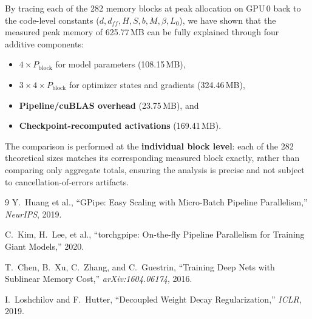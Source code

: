 \documentclass[11pt,a4paper]{article}
\begin{document}
By tracing each of the 282 memory blocks at peak allocation on GPU\,0 back to the code-level constants ($d, d_{ff}, H, S, b, M, \beta, L_0$), we have shown that the measured peak memory of 625.77\,MB can be fully explained through four additive components:
\begin{itemize}
  \item \textbf{$4 \times P_{\text{block}}$} for model parameters (108.15\,MB),
  \item \textbf{$3 \times 4 \times P_{\text{block}}$} for optimizer states and gradients (324.46\,MB),
  \item \textbf{Pipeline/cuBLAS overhead} (23.75\,MB), and
  \item \textbf{Checkpoint-recomputed activations} (169.41\,MB).
\end{itemize}

The comparison is performed at the \textbf{individual block level}: each of the 282 theoretical sizes matches its corresponding measured block exactly, rather than comparing only aggregate totals, ensuring the analysis is precise and not subject to cancellation-of-errors artifacts.

\begin{thebibliography}{9}
Y.~Huang et al.,
``GPipe: Easy Scaling with Micro-Batch Pipeline Parallelism,''
\emph{NeurIPS}, 2019.

C.~Kim, H.~Lee, et al.,
``torchgpipe: On-the-fly Pipeline Parallelism for Training Giant Models,''
2020.

T.~Chen, B.~Xu, C.~Zhang, and C.~Guestrin,
``Training Deep Nets with Sublinear Memory Cost,''
\emph{arXiv:1604.06174}, 2016.

I.~Loshchilov and F.~Hutter,
``Decoupled Weight Decay Regularization,''
\emph{ICLR}, 2019.
\end{thebibliography}
\end{document}
